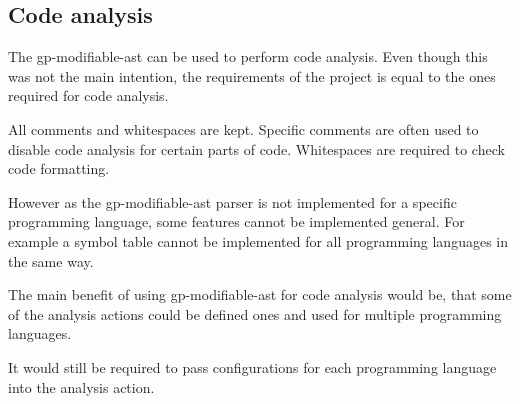 \subsection{Code analysis}

The gp-modifiable-ast can be used to perform code analysis. Even though this was not the main
intention, the requirements of the project is equal to the ones required for code analysis.

All comments and whitespaces are kept. 
Specific comments are often used to disable code analysis for certain parts of code.
Whitespaces are required to check code formatting.

However as the gp-modifiable-ast parser is not implemented for a specific programming language,
some features cannot be implemented general. For example a symbol table cannot be implemented
for all programming languages in the same way.

The main benefit of using gp-modifiable-ast for code analysis would be, that some of the analysis actions
could be defined ones and used for multiple programming languages.

It would still be required to pass configurations for each programming language into the analysis action.